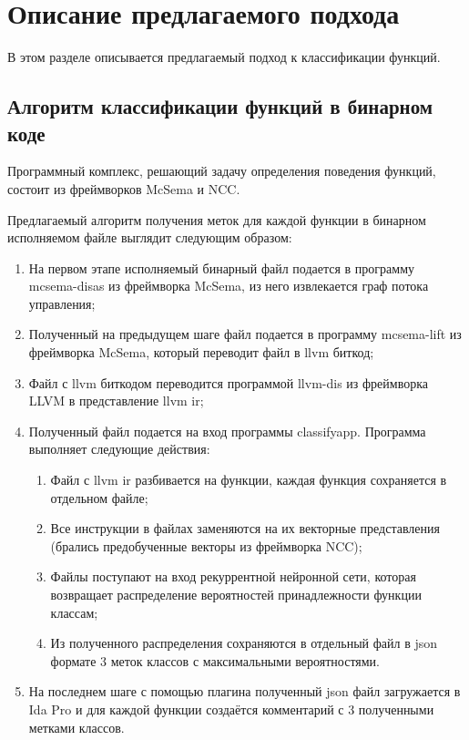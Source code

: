 \section{Описание предлагаемого подхода}
В этом разделе описывается предлагаемый подход к классификации функций.

\subsection{Алгоритм классификации функций в бинарном коде}
Программный комплекс, решающий задачу определения поведения функций, состоит из фреймворков McSema и NCC.

Предлагаемый алгоритм получения меток для каждой функции в бинарном исполняемом файле выглядит следующим образом: 
\begin{enumerate}
    \item На первом этапе исполняемый бинарный файл подается в программу mcsema-disas из фреймворка McSema, из него извлекается граф потока управления;
    \item Полученный на предыдущем шаге файл подается в программу mcsema-lift из фреймворка McSema, который переводит файл в llvm биткод;
    \item Файл с llvm биткодом переводится программой llvm-dis из фреймворка LLVM в представление llvm ir;
    \item Полученный файл подается на вход программы classifyapp. Программа выполняет следующие действия: 
    \begin{enumerate}
        \item Файл с llvm ir разбивается на функции, каждая функция сохраняется в отдельном файле;
        \item Все инструкции в файлах заменяются на их векторные представления (брались предобученные векторы из фреймворка NCC);
        \item Файлы поступают на вход рекуррентной нейронной сети, которая возвращает распределение вероятностей принадлежности функции классам;
        \item Из полученного распределения сохраняются в отдельный файл в json формате 3 меток классов с максимальными вероятностями.
    \end{enumerate}
    \item На последнем шаге с помощью плагина полученный json файл загружается в Ida Pro и для каждой функции создаётся комментарий с 3 полученными метками классов.
\end{enumerate}

